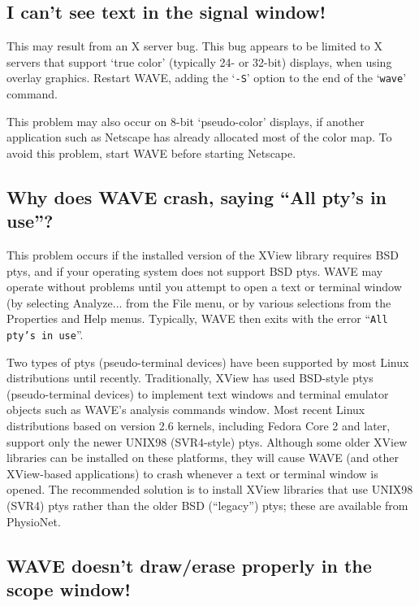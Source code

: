 \documentclass[twoside]{book}
\newcommand{\WAVE}{{\sf WAVE}\xspace}
\begin{document}
\subsection{I can't see text in the signal window!}

\label{faq:cannot-see-text}
\index{S option for WAVE@{\tt -S} option for \WAVE{}}
This may result from an X server bug.  This bug appears to be limited
to X servers that support `true color' (typically 24- or 32-bit) displays,
when using overlay graphics.  Restart \WAVE{}, adding the `{\tt -S}'
option to the end of the `{\tt wave}' command.

This problem may also occur on 8-bit `pseudo-color' displays, if another
application such as Netscape has already allocated most of the color map.
To avoid this problem, start \WAVE{} before starting Netscape.

\subsection{Why does \WAVE{} crash, saying ``All pty's in use''?}

This problem occurs if the installed version of the XView library requires
BSD ptys, and if your operating system does not support BSD ptys. \WAVE{}
may operate without problems until you attempt to open a text or terminal
window (by selecting {\sf Analyze...} from the {\sf File} menu, or by
various selections from the {\sf Properties} and {\sf Help menus}.  Typically,
\WAVE{} then exits with the error ``{\tt All pty's in use}''.

Two types of ptys (pseudo-terminal devices) have been supported by most Linux
distributions until recently. Traditionally, XView has used BSD-style ptys
(pseudo-terminal devices) to implement text windows and terminal emulator
objects such as WAVE's analysis commands window. Most recent Linux
distributions based on version 2.6 kernels, including Fedora Core 2 and later,
support only the newer UNIX98 (SVR4-style) ptys. Although some older XView
libraries can be installed on these platforms, they will cause WAVE (and other
XView-based applications) to crash whenever a text or terminal window is
opened.  The recommended solution is to install XView libraries that use UNIX98
(SVR4) ptys rather than the older BSD (``legacy'') ptys; these are available
from PhysioNet.

\subsection{\WAVE{} doesn't draw/erase properly in the scope window!}
\end{document}
